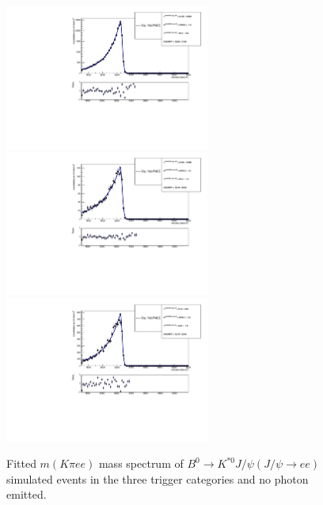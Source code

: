 \begin{figure}[h!]
\centering
\includegraphics[width=0.6\textwidth]{RKst/figs/fit_EEs_0_EE-q2central-gmc/KstJPsEE_0g_L0E_fitAndRes.pdf}
\includegraphics[width=0.6\textwidth]{RKst/figs/fit_EEs_0_EE-q2central-gmc/KstJPsEE_0g_L0H_fitAndRes.pdf}
\includegraphics[width=0.6\textwidth]{RKst/figs/fit_EEs_0_EE-q2central-gmc/KstJPsEE_0g_L0I_fitAndRes.pdf}
\caption{Fitted $m(K\pi ee)$ mass spectrum of $B^0 \rightarrow K^{*0} J/\psi(J/\psi\rightarrow ee)$ simulated
events in the three trigger categories and no photon emitted. }
\label{fig:FitEE_MC_inTrigCat_Brem0}
\end{figure}
%
